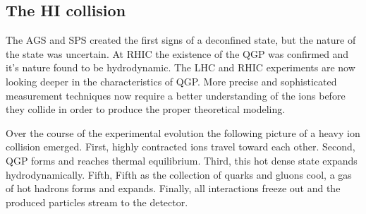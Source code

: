     \subsection{The HI collision}
      The AGS and SPS created the first signs of a deconfined state, but the 
        nature of the state was uncertain.
      At RHIC the existence of the QGP was confirmed and it's nature found to 
        be hydrodynamic.
      The LHC and RHIC experiments are now looking deeper in the characteristics
        of QGP.
      More precise and sophisticated measurement techniques now require a 
        better understanding of the ions before they collide in order to 
        produce the proper theoretical modeling. 

      Over the course of the experimental evolution the following picture of 
        a heavy ion collision emerged. 
      First, highly contracted ions travel toward each other.
      Second, QGP forms and reaches thermal equilibrium.
      Third, this hot dense state expands hydrodynamically.
      Fifth, Fifth as the collection of quarks and gluons cool, a gas of hot
        hadrons forms and expands.
      Finally, all interactions freeze out and the produced particles stream 
        to the detector. 
